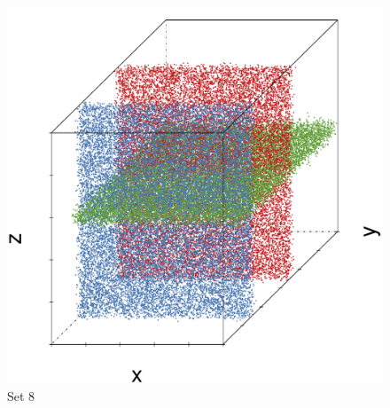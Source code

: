 \begin{subfigure}{0.23\textwidth}
	\centering
	\includegraphics[width=\textwidth]{3/img/datasetplot_ferdosi_5_60000.pdf}
	\caption{Set 8}
	\label{fig:3:simulated:datasets:ferdosi5}
\end{subfigure}	